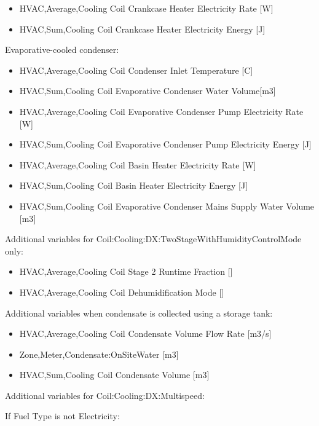\begin{itemize}
\item
  HVAC,Average,Cooling Coil Crankcase Heater Electricity Rate {[}W{]}
\item
  HVAC,Sum,Cooling Coil Crankcase Heater Electricity Energy {[}J{]}
\end{itemize}

Evaporative-cooled condenser:

\begin{itemize}
\item
  HVAC,Average,Cooling Coil Condenser Inlet Temperature {[}C{]}
\item
  HVAC,Sum,Cooling Coil Evaporative Condenser Water Volume{[}m3{]}
\item
  HVAC,Average,Cooling Coil Evaporative Condenser Pump Electricity Rate {[}W{]}
\item
  HVAC,Sum,Cooling Coil Evaporative Condenser Pump Electricity Energy {[}J{]}
\item
  HVAC,Average,Cooling Coil Basin Heater Electricity Rate {[}W{]}
\item
  HVAC,Sum,Cooling Coil Basin Heater Electricity Energy {[}J{]}
\item
  HVAC,Sum,Cooling Coil Evaporative Condenser Mains Supply Water Volume {[}m3{]}
\end{itemize}

Additional variables for Coil:Cooling:DX:TwoStageWithHumidityControlMode only:

\begin{itemize}
\item
  HVAC,Average,Cooling Coil Stage 2 Runtime Fraction {[]}
\item
  HVAC,Average,Cooling Coil Dehumidification Mode {[]}
\end{itemize}

Additional variables when condensate is collected using a storage tank:

\begin{itemize}
\item
  HVAC,Average,Cooling Coil Condensate Volume Flow Rate {[}m3/s{]}
\item
  Zone,Meter,Condensate:OnSiteWater {[}m3{]}
\item
  HVAC,Sum,Cooling Coil Condensate Volume {[}m3{]}
\end{itemize}

Additional variables for Coil:Cooling:DX:Multispeed:

If Fuel Type is not Electricity:

